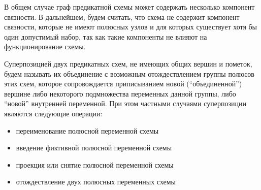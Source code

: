 \documentclass[12pt]{article}
\begin{document}
В общем случае граф предикатной схемы может содержать несколько компонент связности. 
В дальнейшем, будем считать, что схема не содержит компонент связности, 
которые не имеют полюсных узлов и для которых существует хотя бы один допустимый набор, так как такие компоненты не влияют на функционирование схемы.

Суперпозицией двух предикатных схем, не имеющих общих вершин и пометок, 
будем называть их объединение с возможным отождествлением группы полюсов этих схем, 
которое сопровождается приписыванием новой (``объединенной'') вершине либо 
некоторого подмножества переменных данной группы, либо ``новой'' внутренней переменной.
 При этом частными случаями суперпозиции являются следующие операции:
\begin{itemize}
\item переименование полюсной переменной схемы

\item введение фиктивной полюсной переменной схемы

\item проекция или снятие полюсной переменной схемы

\item отождествление двух полюсных переменных схемы
\end{itemize}
\end{document}
